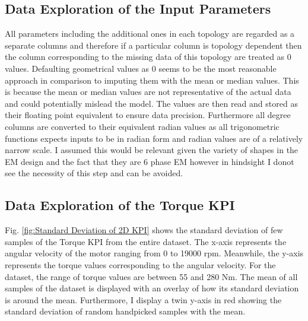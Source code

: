\documentclass{report} %
\begin{document}
\subsection{Data Exploration of the Input Parameters}\label{subsec:Deep Dive into Input Parameters}
All parameters including the additional ones in each topology are regarded as a separate columns and therefore if a particular column is topology dependent then the 
column corresponding to the missing data of this topology are treated as 0 values. Defaulting geometrical values as 0 seems to be the most reasonable approach in comparison 
to imputing them with the mean or median values. This is because the mean or median values are not representative of the actual data and could potentially mislead the model.
The values are then read and stored as their floating point equivalent to ensure data precision.
Furthermore all degree columns are converted to their equivalent radian values as all trigonometric functions expects inputs to be in radian form and radian values are of
a relatively narrow scale. 
I assumed this would be relevant given the variety of shapes in the \ac{EM} design and the fact that they are 6 phase \ac{EM} however in hindsight I donot see the 
necessity of this step and can be avoided.

\subsection{Data Exploration of the Torque KPI}\label{subsec:Deep Dive into 2D KPI}
Fig. \ref{fig:Standard Deviation of 2D KPI} shows the standard deviation of few samples of the Torque \ac{KPI} from the entire dataset.
The x-axis represents the angular velocity of the motor ranging from 0 to 19000 rpm. Meanwhile, the y-axis represents the torque values corresponding to the angular velocity.
For the dataset, the range of torque values are between 55 and 280 Nm. 
The mean of all samples of the dataset is displayed with an overlay of how its standard deviation is around the mean.
Furthermore, I display a twin y-axis in red showing the standard deviation of random handpicked samples with the mean.\\
\end{document}

